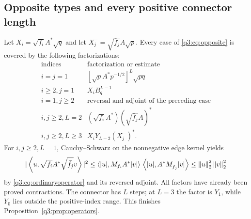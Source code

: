 \subsection{Opposite types and every positive connector length}
Let $X_i=\sqrt{f_i}A^*\sqrt q$ and let $X_j^-=\sqrt{\bar f_j}A\sqrt p$. Every case of \eqref{q3:eq:opposite} is covered by the following factorizations:
\[
\begin{array}{c|l}
\text{indices}&\text{factorization or estimate}\\\hline
i=j=1&[\sqrt p A^*p^{-1/2}]^L\sqrt{pq}\\
i\ge2,j=1&X_i B_q^{L-1}\\
i=1,j\ge2&\text{reversal and adjoint of the preceding case}\\
i,j\ge2,L=2&(\sqrt{f_i}A^*)(\sqrt{\bar f_j}A)^*\\
i,j\ge2,L\ge3&X_iY_{L-2}(X_j^-)^* .
\end{array}
\]
For $i,j\ge2,L=1$, Cauchy--Schwarz on the nonnegative edge kernel yields
\[
 |\left\langle u,\sqrt{f_i}A^*\sqrt{\bar f_j}v\right\rangle|^2
 \le\left\langle|u|,M_{f_i}A^*|v|\right\rangle\,
     \left\langle|u|,A^*M_{\bar f_j}|v|\right\rangle
 \le\left\lVert u\right\rVert_2^2\left\lVert v\right\rVert_2^2
\]
by \eqref{q3:eq:ordinaryoperator} and its reversed adjoint. All factors have already been proved contractions. The connector has $L$ steps; at $L=3$ the factor is $Y_1$, while $Y_0$ lies outside the positive-index range. This finishes Proposition~\ref{q3:prop:operators}.
